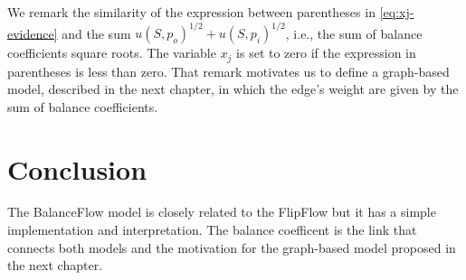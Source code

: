 We remark the similarity of the expression between parentheses in \eqref{eq:xj-evidence} and the sum $u(S,p_o)^{1/2} + u(S,p_i)^{1/2}$, i.e., the sum of balance coefficients square roots. The variable $x_j$ is set to zero if the expression in parentheses is less than zero. That remark motivates us to define a graph-based model, described in the next chapter, in which the edge's weight are given by the sum of balance coefficients.


\section{Conclusion}
The BalanceFlow model is closely related to the FlipFlow but it has a simple implementation and interpretation. The balance coefficent is the link that connects both models and the motivation for the graph-based model proposed in the next chapter.




